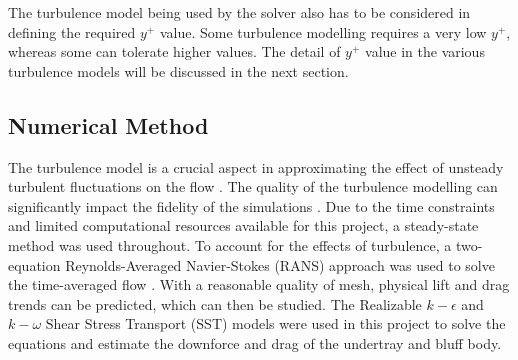\noindent The turbulence model being used by the solver also has to be considered in defining the required $y^+$ value. Some turbulence modelling requires a very low $y^+$, whereas some can tolerate higher values. The detail of $y^+$ value in the various turbulence models will be discussed in the next section. 

\subsection{Numerical Method}
\label{section: Numberical Method}
\noindent The turbulence model is a crucial aspect in approximating the effect of unsteady turbulent fluctuations on the flow \cite{Cummings2015AppliedAerodynamics}. The quality of the turbulence modelling can significantly impact the fidelity of the simulations \cite{Lanfrit2005BestFLUENT}. Due to the time constraints and limited computational resources available for this project, a steady-state method was used throughout. To account for the effects of turbulence, a two-equation Reynolds-Averaged Navier-Stokes (RANS) approach was used to solve the time-averaged flow \cite{Cummings2015AppliedAerodynamics}. With a reasonable quality of mesh, physical lift and drag trends can be predicted, which can then be studied. The Realizable $k-\epsilon$ and $k-\omega$ Shear Stress Transport (SST) models were used in this project to solve the equations and estimate the downforce and drag of the undertray and bluff body.  

